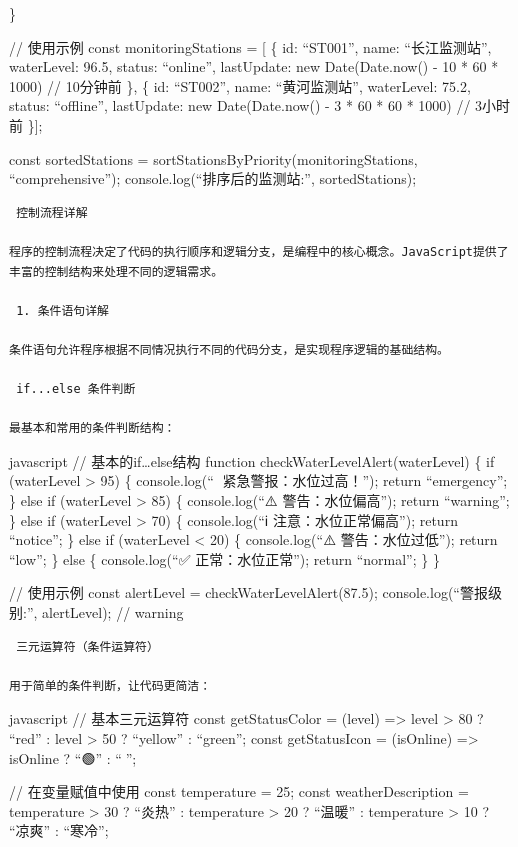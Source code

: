 \}

// 使用示例 const monitoringStations = {[} \{ id: ``ST001'', name: ``长江监测站'', waterLevel: 96.5, status: ``online'', lastUpdate: new Date(Date.now() - 10 * 60 * 1000) // 10分钟前 \}, \{ id: ``ST002'', name: ``黄河监测站'', waterLevel: 75.2, status: ``offline'', lastUpdate: new Date(Date.now() - 3 * 60 * 60 * 1000) // 3小时前 \}{]};

const sortedStations = sortStationsByPriority(monitoringStations, ``comprehensive''); console.log(``排序后的监测站:'', sortedStations);

\begin{lstlisting}
 控制流程详解

程序的控制流程决定了代码的执行顺序和逻辑分支，是编程中的核心概念。JavaScript提供了丰富的控制结构来处理不同的逻辑需求。

 1. 条件语句详解

条件语句允许程序根据不同情况执行不同的代码分支，是实现程序逻辑的基础结构。

 if...else 条件判断

最基本和常用的条件判断结构：
\end{lstlisting}

javascript // 基本的if\ldots else结构 function checkWaterLevelAlert(waterLevel) \{ if (waterLevel \textgreater{} 95) \{ console.log(``🚨 紧急警报：水位过高！''); return ``emergency''; \} else if (waterLevel \textgreater{} 85) \{ console.log(``⚠️ 警告：水位偏高''); return ``warning''; \} else if (waterLevel \textgreater{} 70) \{ console.log(``ℹ️ 注意：水位正常偏高''); return ``notice''; \} else if (waterLevel \textless{} 20) \{ console.log(``⚠️ 警告：水位过低''); return ``low''; \} else \{ console.log(``✅ 正常：水位正常''); return ``normal''; \} \}

// 使用示例 const alertLevel = checkWaterLevelAlert(87.5); console.log(``警报级别:'', alertLevel); // warning

\begin{lstlisting}
 三元运算符（条件运算符）

用于简单的条件判断，让代码更简洁：
\end{lstlisting}

javascript // 基本三元运算符 const getStatusColor = (level) =\textgreater{} level \textgreater{} 80 ? ``red'' : level \textgreater{} 50 ? ``yellow'' : ``green''; const getStatusIcon = (isOnline) =\textgreater{} isOnline ? ``🟢'' : ``🔴'';

// 在变量赋值中使用 const temperature = 25; const weatherDescription = temperature \textgreater{} 30 ? ``炎热'' : temperature \textgreater{} 20 ? ``温暖'' : temperature \textgreater{} 10 ? ``凉爽'' : ``寒冷'';

